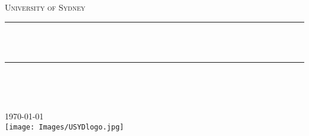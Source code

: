 \begin{titlepage}

\newcommand{\HRule}{\rule{\linewidth}{0.5mm}}

\center %
 

\textsc{\LARGE University of Sydney}\\[1.5cm] %



\HRule \\[0.4cm]
{ \huge \bfseries \reporttitle}\\[0.4cm] %
\HRule \\[1.5cm]
 

\begin{minipage}{0.4\textwidth}
\begin{center}\large 
\authorname\\

\end{center}
\end{minipage}
\vspace{1mm}



{\large \today}\\[2cm] %


\texttt{[image: Images/USYDlogo.jpg]} %
 

\vfill %
\end{titlepage}